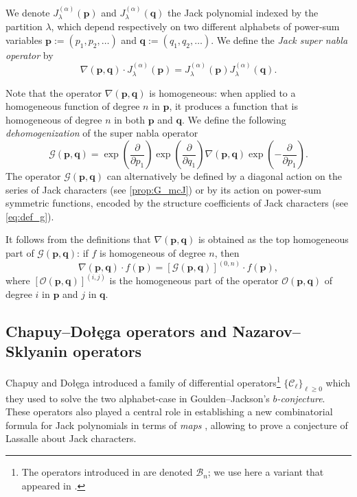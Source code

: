 \documentclass[12pt]{amsart}
\theoremstyle{remark}
\newcommand{\bfp}{\boldsymbol{p}}
\newcommand{\bfq}{\boldsymbol{q}}
\newcommand{\J}{{J}^{(\alpha)}}
\newcommand{\G}{\mathcal G}
\newcommand{\B}{\mathcal B}
\newcommand{\C}{\mathcal C}
\newcommand{\mcO}{\mathcal{O}}
\begin{document}
We denote $\J_\lambda(\bfp)$ and $\J_\lambda(\bfq)$ the Jack polynomial indexed by the partition $\lambda$, which depend respectively on two different alphabets of power-sum variables $\bfp:=(p_1,p_2,\dots)$ and $\bfq:=(q_1,q_2,\dots)$. We define the \emph{Jack super nabla operator} by 
$$\nabla(\bfp,\bfq)\cdot \J_\lambda(\bfp)=\J_\lambda(\bfp)\J_\lambda(\bfq).$$


Note that the operator $\nabla(\bfp,\bfq)$ is homogeneous: when applied to a homogeneous function of degree $n$ in 
$\bfp$, it produces a function that is homogeneous of degree $n$
in both $\bfp$ and $\bfq$.
We define the following \textit{dehomogenization} of the super nabla operator 
\begin{equation}\label{eq:nabla_G}
  \G(\bfp,\bfq)=\exp\left(\frac{\partial}{\partial p_1}\right)\exp\left(\frac{\partial}{\partial q_1}\right)
\nabla(\bfp,\bfq)
\exp\left(-\frac{\partial}{\partial p_1}\right).  
\end{equation}
The operator $\G(\bfp,\bfq)$ can alternatively be defined by a diagonal action on the series of Jack characters (see \cref{prop:G_mcJ}) or by its action on power-sum symmetric functions, encoded by the structure coefficients of Jack characters (see \cref{eq:def_g}).

It follows from the definitions that $\nabla(\bfp,\bfq)$ is obtained as the top homogeneous part of $\G(\bfp,\bfq)$: if $f$ is homogeneous of degree $n$, then
$$\nabla(\bfp,\bfq)\cdot f(\bfp)=\left[\G(\bfp,\bfq)\right]^{(0,n)}\cdot f(\bfp),$$
where $\left[\mcO(\bfp,\bfq)\right]^{(i,j)}$ is the homogeneous part of the operator $\mcO(\bfp,\bfq)$ of degree $i$ in $\bfp$ and $j$ in $\bfq$.



\subsection{Chapuy--Do\l{}e\k{}ga operators and Nazarov--Sklyanin operators}\label{ssec:diff_operators}
Chapuy and Do\l{}e\k{}ga introduced  a family of differential operators\footnote{The operators introduced in \cite{ChapuyDolega2022} are denoted $\B_n$; we use here a variant  that appeared in \cite{BenDaliDolega2023}.} $\{\C_\ell\}_{\ell\geq 0}$ which they used to solve the two alphabet-case in Goulden--Jackson's \emph{$b$-conjecture}. These operators also played a central role in establishing a new combinatorial formula for Jack polynomials in terms of \emph{maps} \cite{BenDaliDolega2023}, allowing to prove a conjecture of Lassalle about Jack characters. 
\end{document}
